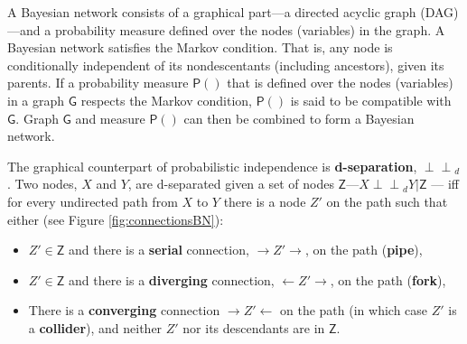 \documentclass[
  10pt,
  dvipsnames,enabledeprecatedfontcommands]{scrartcl}
\newcommand{\indep}{\!\perp \!\!\! \perp\!}
\newcommand{\pr}[1]{\ensuremath{\mathsf{P}(#1)}}
\begin{document}
A Bayesian network consists of a graphical part---a directed acyclic
graph (DAG)---and a probability measure defined over the nodes
(variables) in the graph. A Bayesian network satisfies the Markov
condition. That is, any node is conditionally independent of its
nondescentants (including ancestors), given its parents. If a
probability measure \(\pr{}\) that is defined over the nodes (variables)
in a graph \(\mathsf{G}\) respects the Markov condition, \(\pr{}\) is
said to be compatible with \(\mathsf{G}\). Graph \(\mathsf{G}\) and
measure \(\pr{}\) can then be combined to form a Bayesian network.

The graphical counterpart of probabilistic independence is
\textbf{d-separation}, \(\indep_d\). Two nodes, \(X\) and \(Y\), are
d-separated given a set of nodes
\(\mathsf{Z}\)---\(X\indep_d Y \vert \mathsf{Z}\) --- iff for every
undirected path from \(X\) to \(Y\) there is a node \(Z'\) on the path
such that either (see Figure \ref{fig:connectionsBN}):

\begin{itemize}

\item $Z' \in \mathsf{Z}$ and there is a \textbf{serial} connection, $\rightarrow Z' \rightarrow$, on the path (\textbf{pipe}),
\item  $Z'\in \mathsf{Z}$ and there is a \textbf{diverging} connection, $\leftarrow Z' \rightarrow $, on the path (\textbf{fork}),
\item There is a \textbf{converging} connection $\rightarrow Z' \leftarrow$ on the path (in which case $Z'$ is a \textbf{collider}), and neither $Z'$ nor its descendants are in $\mathsf{Z}$.
\end{itemize}

\vspace{1mm}
\end{document}
